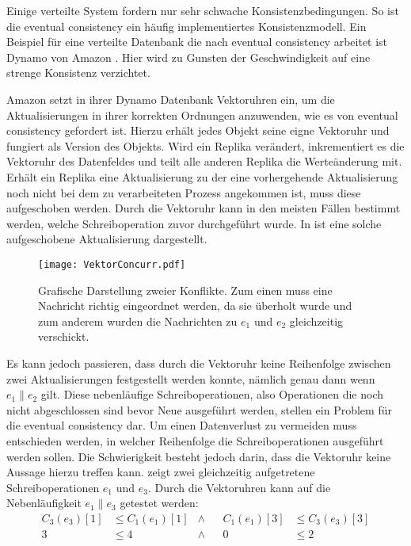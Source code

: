 Einige verteilte System fordern nur sehr schwache Konsistenzbedingungen.
So ist die eventual consistency ein häufig implementiertes Konsistenzmodell.
Ein Beispiel für eine verteilte Datenbank die nach eventual consistency arbeitet ist Dynamo von Amazon \cite{decandia2007dynamo}.
Hier wird zu Gunsten der Geschwindigkeit auf eine strenge Konsistenz verzichtet.

Amazon setzt in ihrer Dynamo Datenbank Vektoruhren ein, um die Aktualisierungen in ihrer korrekten Ordnungen anzuwenden, wie es von eventual consistency gefordert ist.
Hierzu erhält jedes Objekt seine eigne Vektoruhr und fungiert als Version des Objekts.
Wird ein Replika verändert, inkrementiert es die Vektoruhr des Datenfeldes und teilt alle anderen Replika die Werteänderung mit.
Erhält ein Replika eine Aktualisierung zu der eine vorhergehende Aktualisierung noch nicht bei dem zu verarbeiteten Prozess angekommen ist, muss diese aufgeschoben werden.
Durch die Vektoruhr kann in den meisten Fällen bestimmt werden, welche Schreiboperation zuvor durchgeführt wurde.
In  ist eine solche aufgeschobene Aktualisierung dargestellt.

\begin{figure}[ht]
    \centering
    \texttt{[image: VektorConcurr.pdf]}
    \caption[Aufheben von Nachrichten]{Grafische Darstellung zweier Konflikte. Zum einen muss eine Nachricht richtig eingeordnet werden, da sie überholt wurde und zum anderem wurden die Nachrichten zu $e_1$ und $e_2$ gleichzeitig verschickt.}
    \label{fig:vecConcurrent}
\end{figure} 

Es kann jedoch passieren, dass durch die Vektoruhr keine Reihenfolge zwischen zwei Aktualisierungen festgestellt werden konnte, nämlich genau dann wenn $e_1 \parallel e_2$ gilt.
Diese nebenläufige Schreiboperationen, also Operationen die noch nicht abgeschlossen sind bevor Neue ausgeführt werden, stellen ein Problem für die eventual consistency dar.
Um einen Datenverlust zu vermeiden muss entschieden werden, in welcher Reihenfolge die Schreiboperationen ausgeführt werden sollen.
Die Schwierigkeit besteht jedoch darin, dass die Vektoruhr keine Aussage hierzu treffen kann.
 zeigt zwei gleichzeitig aufgetretene Schreiboperationen $e_1$ und $e_3$.
Durch die Vektoruhren kann auf die Nebenläufigkeit $e_1 \parallel e_3$ getestet werden:
\begin{align*}
      C_3(e_3)[1] & \leq C_1(e_1)[1] & \wedge & & C_1(e_1)[3] & \leq C_3(e_3)[3] \\
        3         & \leq 4           & \wedge & & 0           & \leq 2
\end{align*}

